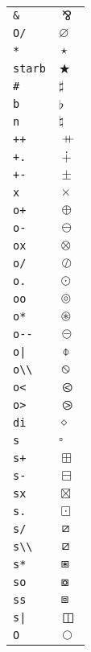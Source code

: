 \begin{longtable}{ll}
\texttt{\&}&${}\bindnasrepma {}$\\
\texttt{O/}&${}\varnothing {}$\\
\texttt{*}&${}\star {}$\\
\texttt{starb}&${}\bigstar {}$\\
\texttt{\#}&${}\sharp {}$\\
\texttt{b}&${}\flat {}$\\
\texttt{n}&${}\natural {}$\\
\texttt{++}&${}\mathbin{{+}\mspace{-8mu}{+}} {}$\\
\texttt{+.}&${}\dotplus {}$\\
\texttt{+{-}}&${}\pm {}$\\
\texttt{x}&${}\times {}$\\
\texttt{o+}&${}\oplus {}$\\
\texttt{o{-}}&${}\ominus {}$\\
\texttt{ox}&${}\otimes {}$\\
\texttt{o/}&${}\oslash {}$\\
\texttt{o.}&${}\odot {}$\\
\texttt{oo}&${}\circledcirc {}$\\
\texttt{o*}&${}\circledast {}$\\
\texttt{o{-}{-}}&${}\circleddash {}$\\
\texttt{o|}&${}\obar {}$\\
\texttt{o\textbackslash \textbackslash }&${}\obslash {}$\\
\texttt{o<}&${}\olessthan {}$\\
\texttt{o>}&${}\ogreaterthan {}$\\
\texttt{di}&${}\diamond {}$\\
\texttt{s}&${}\square {}$\\
\texttt{s+}&${}\boxplus {}$\\
\texttt{s{-}}&${}\boxminus {}$\\
\texttt{sx}&${}\boxtimes {}$\\
\texttt{s.}&${}\boxdot {}$\\
\texttt{s/}&${}\boxslash {}$\\
\texttt{s\textbackslash \textbackslash }&${}\boxslash {}$\\
\texttt{s*}&${}\boxast {}$\\
\texttt{so}&${}\boxcircle {}$\\
\texttt{ss}&${}\boxbox {}$\\
\texttt{s|}&${}\boxbar {}$\\
\texttt{O}&${}\bigcirc {}$\\

\end{longtable}
